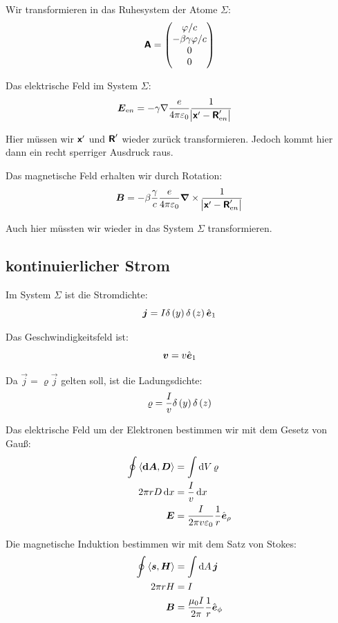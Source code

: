 Wir transformieren in das Ruhesystem der Atome $\Sigma$:
\[
	\boldsymbol{\mathsf{A}}
	=
	\begin{pmatrix}
		\varphi / c \\ - \beta \gamma \varphi / c \\ 0 \\ 0
	\end{pmatrix}
\]

Das elektrische Feld im System $\Sigma$:
\begin{align*}
	\boldsymbol{E}_{\text en}
	&= - \gamma \nabla \frac{e}{4 \pi \varepsilon_0}
	\frac{1}{\abs{\boldsymbol{\mathsf{x}}' - \boldsymbol{\mathsf{R}}'_{\text en}}}
\end{align*}

Hier müssen wir $\boldsymbol{\mathsf{x}}'$ und $\boldsymbol{\mathsf{R}}'$ wieder zurück transformieren. Jedoch
kommt hier dann ein recht sperriger Ausdruck raus.

\fehlt

Das magnetische Feld erhalten wir durch Rotation:
\[
	\boldsymbol{B} = - \beta \frac \gamma c \frac{e}{4\pi\varepsilon_0} \boldsymbol{\nabla} \times 
	\frac{1}{\abs{\boldsymbol{\mathsf{x}}' - \boldsymbol{\mathsf{R}}'_{\text en}}}
\]

Auch hier müssten wir wieder in das System $\Sigma$ transformieren.

\fehlt

\subsection{kontinuierlicher Strom}

Im System $\Sigma$ ist die Stromdichte:
\[
	\vec j = I \delta\del y \delta\del z \ev_1
\]

Das Geschwindigkeitsfeld ist:
\[
	\boldsymbol{v} = v \hat{\boldsymbol{e}}_1
\]

Da $\vec j = \varrho \vec j$ gelten soll, ist die Ladungsdichte:
\[
	\varrho = \frac Iv \delta\del y \delta\del z
\]

Das elektrische Feld um der Elektronen bestimmen wir mit dem Gesetz von Gauß:
\begin{align*}
	\oint \inner{\vec{\dif A}}{\vec D}
	&=
	\int \dif V \, \varrho \\
	2 \pi r D \dif x &= \frac Iv \dif x \\
	\vec E &= \frac{I}{2\pi v \varepsilon_0} \frac 1r \ev_\rho
\end{align*}

Die magnetische Induktion bestimmen wir mit dem Satz von Stokes:
\begin{align*}
	\oint \inner{\vec s}{\vec H} &= \int \dif A \, \vec j \\
	2 \pi r H &= I \\
	\vec B &= \frac{\mu_0 I}{2 \pi} \frac 1r \ev_\phi
\end{align*}

